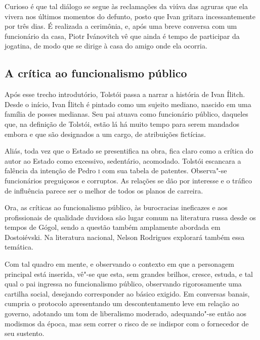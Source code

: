 \documentclass[12pt]{extarticle}
\begin{document}
Curioso é que tal diálogo se segue às reclamações da viúva das agruras
que ela vivera nos últimos momentos do defunto, posto que 
Ivan gritara incessantemente por três dias. 
É realizada a cerimônia, e, após uma breve conversa com um funcionário
da casa, Piotr Ivánovitch vê que ainda é tempo de participar da
jogatina, de modo que se dirige à casa do amigo onde ela ocorria.

\subsection{A crítica ao funcionalismo público}

Após esse trecho introdutório, Tolstói passa a narrar a história de
Ivan Ílitch. Desde o início, Ivan Ílitch é pintado como um sujeito
mediano, nascido em uma família de posses medianas. Seu pai atuava como
funcionário público, daqueles que, na definição de Tolstói, estão lá há
muito tempo para serem mandados embora e que são designados a um cargo, 
de atribuições fictícias.

Aliás, toda vez que o Estado se presentifica na obra, fica claro 
como a crítica do autor ao Estado como excessivo, sedentário, 
acomodado. Tolstói escancara a
falência da intenção de Pedro \textsc{i} com sua tabela de patentes. Observa"-se
funcionários preguiçosos e corruptos. As relações se dão
por interesse e o tráfico de influência parece ser o melhor de todos os
planos de carreira.




Ora, as críticas ao funcionalismo público, às burocracias ineficazes e
aos profissionais de qualidade duvidosa são lugar comum na literatura
russa desde os tempos de Gógol, sendo a questão também amplamente
abordada em Dostoiévski. Na literatura nacional, Nelson Rodrigues
explorará também essa temática.

Com tal quadro em mente, e observando o contexto em que a personagem
principal está inserida, vê"-se que esta, sem grandes brilhos, cresce, 
estuda, e tal qual o pai ingressa no funcionalismo
público, observando rigorosamente uma cartilha social, desejando 
corresponder ao básico exigido. Em conversas banais, cumpria o protocolo
apresentando um descontentamento leve em relação ao governo, adotando um
tom de liberalismo moderado, adequando"-se então aos modismos da época,
mas sem correr o risco de se indispor com o fornecedor de seu sustento.
\end{document}
